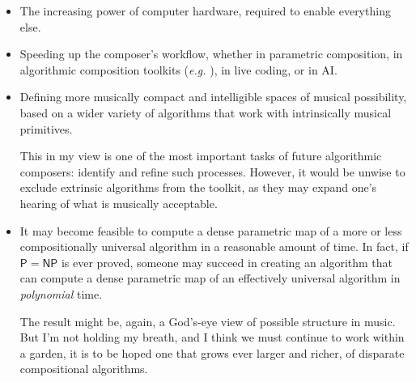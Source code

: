 \documentclass[11pt,papersize=a4]{scrartcl}
\begin{document}
\begin{itemize}
\item The increasing power of computer hardware, required to enable everything else.
\item Speeding up the composer's workflow, whether in parametric composition, in algorithmic composition toolkits (\emph{e.g.} \cite{bellingham2019toward}), in live coding, or in AI.
\item Defining more musically compact and intelligible spaces of musical possibility, based on a wider variety of algorithms that work with intrinsically musical primitives. 

This in my view is one of the most important tasks of future algorithmic composers: identify and refine such processes. However, it would be unwise to exclude extrinsic algorithms from the toolkit, as they may expand one's hearing of what is musically acceptable.
\item  It may become feasible to compute a dense parametric map of a more or less compositionally universal algorithm in a reasonable amount of time. In fact, if $\mathsf{P} = \mathsf{NP}$ is ever proved, someone may succeed in creating an algorithm that can compute a dense parametric map of an effectively universal algorithm in \emph{polynomial} time. 

The result might be, again, a God's-eye view of possible structure in music. But I'm not holding my breath, and I think we must continue to work within a garden, it is to be hoped one that grows ever larger and richer, of disparate compositional algorithms.
\end{itemize}


\printbibliography
\end{document}
